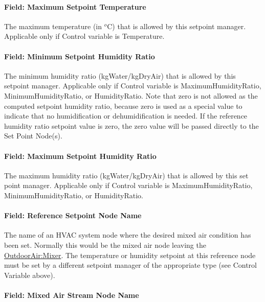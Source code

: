 \paragraph{Field: Maximum Setpoint Temperature}\label{field-maximum-setpoint-temperature}

The maximum temperature (in \(^{o}\)C) that is allowed by this setpoint manager. Applicable only if Control variable is Temperature.

\paragraph{Field: Minimum Setpoint Humidity Ratio}\label{field-minimum-setpoint-humidity-ratio}

The minimum humidity ratio (kgWater/kgDryAir) that is allowed by this setpoint manager. Applicable only if Control variable is MaximumHumidityRatio, MinimumHumidityRatio, or HumidityRatio. Note that zero is not allowed as the computed setpoint humidity ratio, because zero is used as a special value to indicate that no humidification or dehumidification is needed. If the reference humidity ratio setpoint value is zero, the zero value will be passed directly to the Set Point Node(s).

\paragraph{Field: Maximum Setpoint Humidity Ratio}\label{field-maximum-setpoint-humidity-ratio}

The maximum humidity ratio (kgWater/kgDryAir) that is allowed by this set point manager. Applicable only if Control variable is MaximumHumidityRatio, MinimumHumidityRatio, or HumidityRatio.

\paragraph{Field: Reference Setpoint Node Name}\label{field-reference-setpoint-node-name-1}

The name of an HVAC system node where the desired mixed air condition has been set. Normally this would be the mixed air node leaving the \hyperref[outdoorairmixer]{OutdoorAir:Mixer}. The temperature or humidity setpoint at this reference node must be set by a different setpoint manager of the appropriate type (see Control Variable above).

\paragraph{Field: Mixed Air Stream Node Name}\label{field-mixed-air-stream-node-name}

